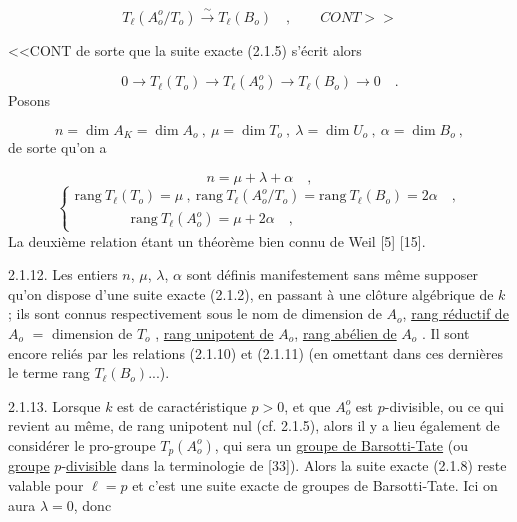 \begin{equation}\tag{2.1.7}
T_\ell(A_o^o/T_o) \overset{\sim}{\longrightarrow} T_\ell(B_o) \quad , \qquad CONT>>
\end{equation}


<<CONT de sorte que la suite exacte (2.1.5) s'écrit alors

\begin{equation}\tag{2.1.8}
0 \longrightarrow T_\ell(T_o) \longrightarrow T_\ell(A_o^o) \longrightarrow T_\ell(B_o) \longrightarrow 0 \quad .
\end{equation}
Posons

\begin{equation}\tag{2.1.9}
n = \dim A_K = \dim A_o \ , \ \mu = \dim T_o \ , \ \lambda = \dim U_o \ , \ \alpha = \dim B_o \ ,
\end{equation}
de sorte qu'on a

\begin{equation}\tag{2.1.10}
n = \mu + \lambda + \alpha \quad ,
\end{equation}
\begin{equation}\tag{2.1.11}
\left\{
\begin{array}{l}
\mathrm{rang}\ T_\ell(T_o) = \mu \ , \ \mathrm{rang}\ T_\ell(A_o^o/T_o) = \mathrm{rang}\ T_\ell(B_o) = 2\alpha \quad , \\[1ex]
\qquad\qquad \mathrm{rang}\ T_\ell(A_o^o) = \mu + 2\alpha \quad ,
\end{array}
\right.
\end{equation}
La deuxième relation étant un théorème bien connu de Weil [5] [15].

2.1.12. Les entiers $n$, $\mu$, $\lambda$, $\alpha$ sont définis manifestement sans même supposer qu'on dispose d'une suite exacte (2.1.2), en passant à une clôture algébrique de $k$ ; ils sont connus respectivement sous le nom de dimension de $A_o$, \underline{rang réductif de} $A_o$ $=$ dimension de $T_o$ , \underline{rang unipotent de} $A_o$, \underline{rang abélien de} $A_o$ . Il sont encore reliés par les relations (2.1.10) et (2.1.11) (en omettant dans ces dernières le terme rang $T_\ell(B_o)$...).

2.1.13. Lorsque $k$ est de caractéristique $p > 0$, et que $A_o^o$ est $p$-divisible, ou ce qui revient au même, de rang unipotent nul (cf. 2.1.5), alors il y a lieu également de considérer le pro-groupe $T_p(A_o^o)$, qui sera un \underline{groupe de Barsotti-Tate} (ou \underline{groupe} $p$-\underline{divisible} dans la terminologie de [33]). Alors la suite exacte (2.1.8) reste valable pour $\ell = p$ et c'est une suite exacte de groupes de Barsotti-Tate. Ici on aura $\lambda = 0$, donc

